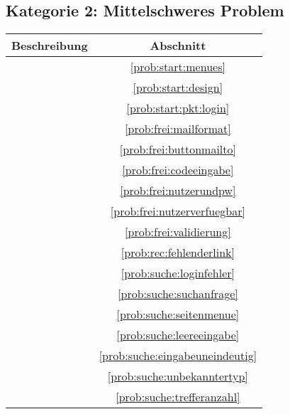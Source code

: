 \subsection*{Kategorie 2: Mittelschweres Problem}
\begin{tabular}{|p{12cm}|c|}
\hline
\textbf{Beschreibung} & \textbf{Abschnitt} \\
\hline\hline
\nameref{prob:start:menues} & \ref{prob:start:menues} \\
\nameref{prob:start:design} & \ref{prob:start:design} \\
\nameref{prob:start:pkt:login} & \ref{prob:start:pkt:login}\\
\nameref{prob:frei:mailformat} & \ref{prob:frei:mailformat}\\
\nameref{prob:frei:buttonmailto} & \ref{prob:frei:buttonmailto}\\
\nameref{prob:frei:codeeingabe} & \ref{prob:frei:codeeingabe}\\
\nameref{prob:frei:nutzerundpw} & \ref{prob:frei:nutzerundpw}\\
\nameref{prob:frei:nutzerverfuegbar} & \ref{prob:frei:nutzerverfuegbar}\\
\nameref{prob:frei:validierung} & \ref{prob:frei:validierung}\\
\nameref{prob:rec:fehlenderlink} & \ref{prob:rec:fehlenderlink}\\
\nameref{prob:suche:loginfehler} & \ref{prob:suche:loginfehler}\\
\nameref{prob:suche:suchanfrage} & \ref{prob:suche:suchanfrage}\\
\nameref{prob:suche:seitenmenue} & \ref{prob:suche:seitenmenue}\\
\nameref{prob:suche:leereeingabe} & \ref{prob:suche:leereeingabe}\\
\nameref{prob:suche:eingabeuneindeutig} & \ref{prob:suche:eingabeuneindeutig}\\
\nameref{prob:suche:unbekanntertyp} & \ref{prob:suche:unbekanntertyp}\\
\nameref{prob:suche:trefferanzahl} & \ref{prob:suche:trefferanzahl}\\
\hline

\end{tabular}

